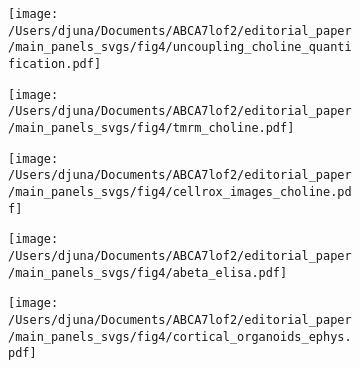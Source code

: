 \documentclass[12pt]{article}
\begin{document}
\begin{figure}[H]
    \begin{subfigure}[t]{.2\textwidth}
        \caption{}
        \texttt{[image: /Users/djuna/Documents/ABCA7lof2/editorial\_paper/main\_panels\_svgs/fig4/uncoupling\_choline\_quantification.pdf]}        
    \end{subfigure}  
    \hspace{.4cm}  
    \begin{subfigure}[t]{.4\textwidth}
        \caption{}
        \vspace{-0.15cm}
        \texttt{[image: /Users/djuna/Documents/ABCA7lof2/editorial\_paper/main\_panels\_svgs/fig4/tmrm\_choline.pdf]}        
    \end{subfigure} 
   
    \begin{subfigure}[t]{.4\textwidth}
        \caption{}
        \texttt{[image: /Users/djuna/Documents/ABCA7lof2/editorial\_paper/main\_panels\_svgs/fig4/cellrox\_images\_choline.pdf]}        
    \end{subfigure}
    \begin{subfigure}[t]{.39\textwidth}
        \caption{}
        \texttt{[image: /Users/djuna/Documents/ABCA7lof2/editorial\_paper/main\_panels\_svgs/fig4/abeta\_elisa.pdf]}        
    \end{subfigure}  
    \begin{subfigure}[t]{.2\textwidth}
        \caption{}
        \texttt{[image: /Users/djuna/Documents/ABCA7lof2/editorial\_paper/main\_panels\_svgs/fig4/cortical\_organoids\_ephys.pdf]}        
    \end{subfigure} 
\end{figure}
\end{document}
